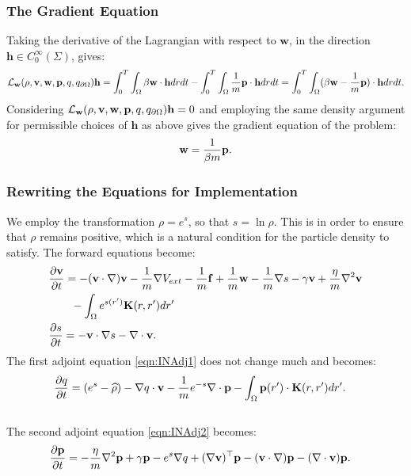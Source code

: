 \subsubsection{The Gradient Equation}
Taking the derivative of the Lagrangian with respect to $\mathbf{w}$, in the direction $\mathbf{h} \in C_0^\infty(\Sigma)$, gives:
\begin{align*}
\mathcal{L}_{\mathbf{w}}(\rho,\mathbf{v},\mathbf{w},\mathbf{p},q,{q}_{\partial \Omega}) \mathbf{h}= \int_0^T \int_\Omega \beta \mathbf{w} \cdot \mathbf{h} dr dt - \int_0^T \int_\Omega \frac{1}{m} \mathbf{p} \cdot \mathbf{h} dr dt 
= \int_0^T \int_\Omega ( \beta \mathbf{w} - \frac{1}{m}\mathbf{p}) \cdot \mathbf{h} dr dt.
\end{align*}
Considering $\mathcal{L}_{\mathbf{w}}(\rho,\mathbf{v},\mathbf{w},\mathbf{p},q,{q}_{\partial \Omega}) \mathbf{h} =0$ and employing the same density argument for permissible choices of $\mathbf{h}$ as above gives the gradient equation of the problem:
\begin{align*}
 \mathbf{w} = \frac{1}{\beta m} \mathbf{p}.
\end{align*}

\subsubsection{Rewriting the Equations for Implementation} \label{sec:INImplementation}
We employ the transformation $\rho = e^s$, so that $s = \ln \rho$. This is in order to ensure that $\rho$ remains positive, which is a natural condition for the particle density to satisfy. 
The forward equations become:
\begin{align*}
& \frac{\partial \ve}{\partial t}= -  (\ve \cdot \nabla)\ve - \frac{1}{m} \nabla V_{ext} -\frac{1}{m}\f +\frac{1}{m} \mathbf{w} - \frac{1}{m} \nabla s - \gamma \ve +  \frac{\eta}{m} \nabla^2 \ve\\ %
&\quad \quad  -\int_\Omega e^{s(r')} \mathbf{K}(r,r')dr' \notag\\
 &\frac{\partial s}{\partial t} = - \ve \cdot \nabla s - \nabla \cdot \ve. %
\end{align*}
The first adjoint equation \eqref{eqn:INAdj1} does not change much and becomes:
\begin{align*}
&  \frac{\partial q}{\partial t}  = (e^s - \widehat \rho)- \nabla q \cdot \mathbf{v}-\frac{1}{m} e^{-s}\nabla \cdot \mathbf{p}-  \int_\Omega  \mathbf{p}(r') \cdot\mathbf{K}(r,r')   dr' .
\end{align*}
\\
The second adjoint equation \eqref{eqn:INAdj2} becomes:
\begin{align*}
&\frac{\partial \mathbf{p}}{\partial t} =  - \frac{\eta}{m} \nabla^2 \mathbf{p}  + \gamma\mathbf{p}-e^s\nabla q +(\nabla \mathbf{v})^\top\mathbf{p} 
- (\mathbf{v} \cdot \nabla)\mathbf{p} -  (\nabla \cdot \mathbf{v})\mathbf{p}   .
\end{align*}

